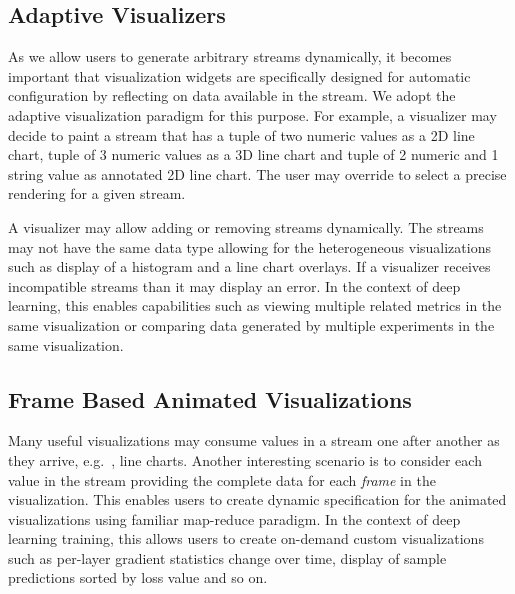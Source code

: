 \documentclass[sigchi]{acmart} %
\begin{document}
\subsection{Adaptive Visualizers}
As we allow users to generate arbitrary streams dynamically, it becomes important that visualization widgets are specifically designed for automatic configuration by reflecting on data available in the stream. We adopt the adaptive visualization paradigm\cite{Nazemi2016, mourlas2009intelligent} for this purpose. For example, a visualizer may decide to paint a stream that has a tuple of two numeric values as a 2D line chart, tuple of 3 numeric values as a 3D line chart and tuple of 2 numeric and 1 string value as annotated 2D line chart. The user may override to select a precise rendering for a given stream.

A visualizer may allow adding or removing streams dynamically. The streams may not have the same data type allowing for the heterogeneous visualizations such as display of a histogram and a line chart overlays. If a visualizer receives incompatible streams than it may display an error. In the context of deep learning, this enables capabilities such as viewing multiple related metrics in the same visualization or comparing data generated by multiple experiments in the same visualization.



\subsection{Frame Based Animated Visualizations}
Many useful visualizations may consume values in a stream one after another as they arrive, e.g.\ , line charts. Another interesting scenario is to consider each value in the stream providing the complete data for each \emph{frame} in the visualization. This enables users to create dynamic specification for the animated visualizations using familiar map-reduce paradigm. In the context of deep learning training, this allows users to create on-demand custom visualizations such as per-layer gradient statistics change over time, display of sample predictions sorted by loss value and so on.
\end{document}

